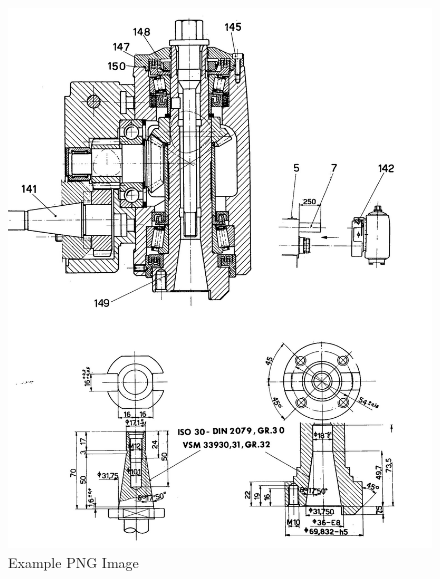\newpage
\begin{figure}[h]
    \centering
    \includegraphics[width=1.0\linewidth]{./images/page_35}
    \caption{Example PNG Image}
    \label{fig:milling_head}
\end{figure}

